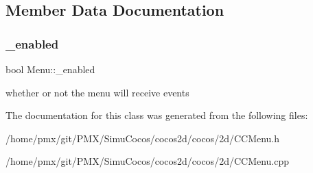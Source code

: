 \subsection{Member Data Documentation}
\mbox{\label{classMenu_a37190ed4d5d13bb631a0fe23bf307180}} 
\subsubsection{\texorpdfstring{\+\_\+enabled}{\_enabled}}
{\footnotesize\ttfamily bool Menu\+::\+\_\+enabled\hspace{0.3cm}{\ttfamily [protected]}}

whether or not the menu will receive events 

The documentation for this class was generated from the following files\+:\begin{DoxyCompactItemize}
\item 
/home/pmx/git/\+P\+M\+X/\+Simu\+Cocos/cocos2d/cocos/2d/C\+C\+Menu.\+h\item 
/home/pmx/git/\+P\+M\+X/\+Simu\+Cocos/cocos2d/cocos/2d/C\+C\+Menu.\+cpp\end{DoxyCompactItemize}
